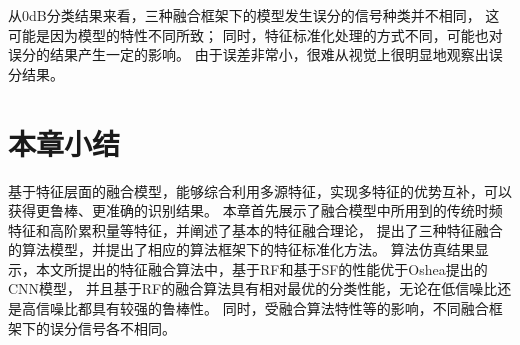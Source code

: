 从0dB分类结果来看，三种融合框架下的模型发生误分的信号种类并不相同，
这可能是因为模型的特性不同所致；
同时，特征标准化处理的方式不同，可能也对误分的结果产生一定的影响。
由于误差非常小，很难从视觉上很明显地观察出误分结果。

\section{本章小结}
基于特征层面的融合模型，能够综合利用多源特征，实现多特征的优势互补，可以获得更鲁棒、更准确的识别结果。
本章首先展示了融合模型中所用到的传统时频特征和高阶累积量等特征，并阐述了基本的特征融合理论，
提出了三种特征融合的算法模型，并提出了相应的算法框架下的特征标准化方法。
算法仿真结果显示，本文所提出的特征融合算法中，基于RF和基于SF的性能优于Oshea提出的CNN模型，
并且基于RF的融合算法具有相对最优的分类性能，无论在低信噪比还是高信噪比都具有较强的鲁棒性。
同时，受融合算法特性等的影响，不同融合框架下的误分信号各不相同。
\par
